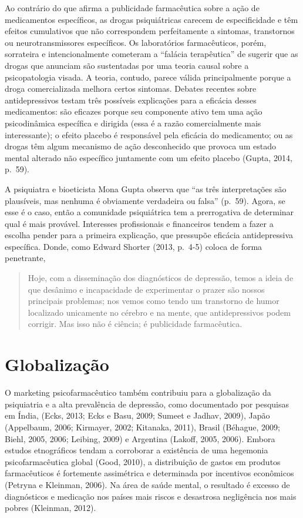 Ao contrário do que afirma a publicidade farmacêutica sobre a ação de
medicamentos específicos, as drogas psiquiátricas carecem de
especificidade e têm efeitos cumulativos que não correspondem
perfeitamente a sintomas, transtornos ou neurotransmissores específicos.
Os laboratórios farmacêuticos, porém, sorrateira e intencionalmente
cometeram a ``falácia terapêutica'' de sugerir que as drogas que
anunciam são sustentadas por uma teoria causal sobre a psicopatologia
visada. A teoria, contudo, parece válida principalmente porque a droga
comercializada melhora certos sintomas. Debates recentes sobre
antidepressivos testam três possíveis explicações para a eficácia desses
medicamentos: são eficazes porque seu componente ativo tem uma ação
psicodinâmica específica e dirigida (essa é a razão comercialmente mais
interessante); o efeito placebo é responsável pela eficácia do
medicamento; ou as drogas têm algum mecanismo de ação desconhecido que
provoca um estado mental alterado não específico juntamente com um
efeito placebo (Gupta, 2014, p.~59).

A psiquiatra e bioeticista Mona Gupta observa que ``as três
interpretações são plausíveis, mas nenhuma é obviamente verdadeira ou
falsa'' (p.~59). Agora, se esse é o caso, então a comunidade psiquiátrica
tem a prerrogativa de determinar qual é mais provável. Interesses
profissionais e financeiros tendem a fazer a escolha pender para a
primeira explicação, que pressupõe eficácia antidepressiva específica.
Donde, como Edward Shorter (2013, p.~4-5) coloca de forma penetrante,

\begin{quote}
Hoje, com a disseminação dos diagnósticos de depressão, temos a ideia de
que desânimo e incapacidade de experimentar o prazer são nossos
principais problemas; nos vemos como tendo um transtorno de humor
localizado unicamente no cérebro e na mente, que antidepressivos podem
corrigir. Mas isso não é ciência; é publicidade farmacêutica.
\end{quote}

\section{Globalização}

O marketing psicofarmacêutico também contribuiu para a globalização da
psiquiatria e a alta prevalência de depressão, como documentado por
pesquisas em Índia, (Ecks, 2013; Ecks e Basu, 2009; Sumeet e Jadhav,
2009), Japão (Appelbaum, 2006; Kirmayer, 2002; Kitanaka, 2011), Brasil
(Béhague, 2009; Biehl, 2005, 2006; Leibing, 2009) e Argentina (Lakoff,
2005, 2006). Embora estudos etnográficos tendam a corroborar a
existência de uma hegemonia psicofarmacêutica global (Good, 2010), a
distribuição de gastos em produtos farmacêuticos é fortemente
assimétrica e determinada por incentivos econômicos (Petryna e Kleinman,
2006). Na área de saúde mental, o resultado é excesso de diagnósticos e
medicação nos países mais riscos e desastrosa negligência nos mais
pobres (Kleinman, 2012).

